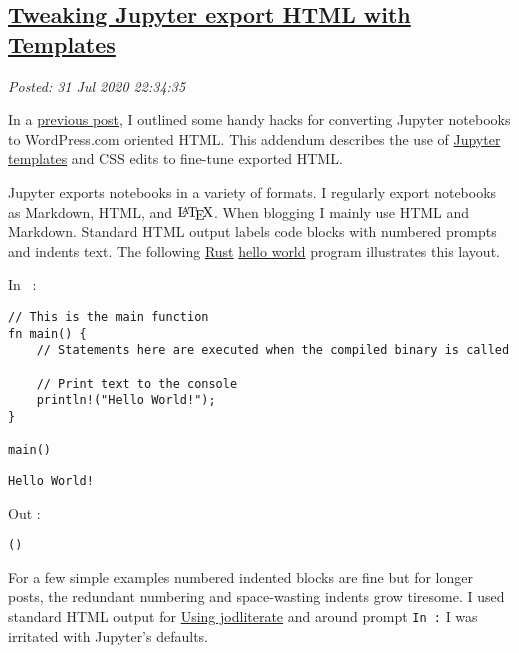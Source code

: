 %

\subsection*{\href{http://analyzethedatanotthedrivel.org/2020/07/31/tweaking-jupyter-export-html-with-templates/}{Tweaking Jupyter export HTML with Templates}}


\noindent\emph{Posted: 31 Jul 2020 22:34:35}
\vspace{6pt}

In a
\href{https://analyzethedatanotthedrivel.org/2020/06/01/better-blogging-with-jupyter-notebooks-on-wordpress-com/}{previous
post}, I outlined some handy hacks for converting Jupyter notebooks to
WordPress.com oriented HTML. This addendum describes the use of
\href{https://www.datacamp.com/community/tutorials/jinja2-custom-export-templates-jupyter}{Jupyter
templates} and CSS edits to fine-tune exported HTML.

Jupyter exports notebooks in a variety of formats. I regularly export
notebooks as Markdown, HTML, and $\LaTeX$. When blogging I mainly
use HTML and Markdown. Standard HTML output labels code blocks with
numbered prompts and indents text. The following
\href{https://www.rust-lang.org/}{Rust}
\href{https://en.wikipedia.org/wiki/\%22Hello,_World!\%22_program}{hello
world} program illustrates this layout.

In~
:

\begin{verbatim}
// This is the main function
fn main() {
    // Statements here are executed when the compiled binary is called

    // Print text to the console
    println!("Hello World!");
}

main()
\end{verbatim}

\begin{verbatim}
Hello World!
\end{verbatim}

Out
:

\begin{verbatim}
()
\end{verbatim}

For a few simple examples numbered indented blocks are fine but for
longer posts, the redundant numbering and space-wasting indents grow
tiresome. I used standard HTML output for
\href{https://analyzethedatanotthedrivel.org/2020/05/25/using-jodliterate/}{Using
jodliterate} and around prompt \texttt{In
:} I was irritated with
Jupyter's defaults.

